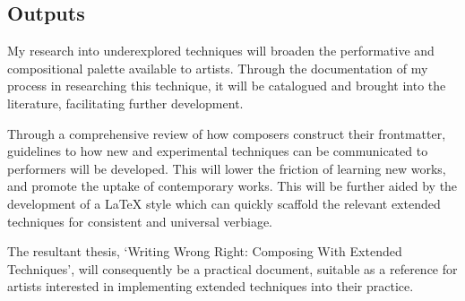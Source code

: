 \subsection{Outputs}
My research into underexplored techniques will broaden the performative and compositional palette available to artists. 
Through the documentation of my process in researching this technique, it will be catalogued and brought into the literature, facilitating further development.


Through a comprehensive review of how composers construct their frontmatter, guidelines to how new and experimental techniques can be communicated to performers will be developed.
This will lower the friction of learning new works, and promote the uptake of contemporary works.
This will be further aided by the development of a \LaTeX{} style which can quickly scaffold the relevant extended techniques for consistent and universal verbiage.

The resultant thesis, `Writing Wrong Right: Composing With Extended Techniques', will consequently be a practical document, suitable as a reference for artists interested in implementing extended techniques into their practice.